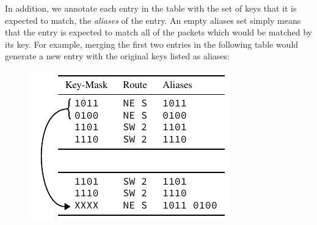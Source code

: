 \documentclass[conference]{IEEEtran}
\begin{document}
  In addition, we annotate each entry in the table with the set of keys that it is expected to match, the \textit{aliases} of the entry.
  An empty aliases set simply means that the entry is expected to match all of the packets which would be matched by its key.
  For example, merging the first two entries in the following table would generate a new entry with the original keys listed as aliases:

  \begin{figure}[H]
    \centering
    \includegraphics{figures/aliases_example}
  \end{figure}
\end{document}
